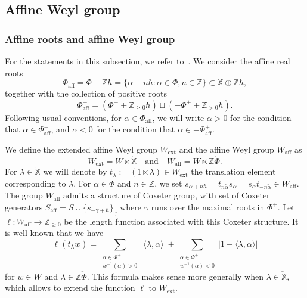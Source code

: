 \documentclass[11pt]{amsart}
\numberwithin{equation}{section}
\theoremstyle{plain}
\theoremstyle{definition}
\newcommand{\X}{{\mathbb X}}
\newcommand{\Xd}{\check{\X}}
\newcommand{\Z}{{\mathbb Z}}
\newcommand{\ex}{\mathrm{ext}}
\newcommand{\af}{\mathrm{aff}}
\begin{document}
\subsection{Affine Weyl group} 

\subsubsection{Affine roots and affine Weyl group} 

For the statements in this subsection, we refer to~\cite[\S\S 1--2]{macdonald}.
We consider the affine real roots 
\[
\Phi_\af=\Phi+\Z\hbar= \{\alpha+n\hbar : \alpha\in \Phi,n\in \Z\} \subset \X \oplus \Z \hbar,
\] 
together with the collection of positive roots
\[
\Phi^+_\af=(\Phi^++\Z_{\geq 0}\hbar) \sqcup (-\Phi^++\Z_{> 0}\hbar).
\] 
Following usual conventions, for $\alpha \in \Phi_\af$, we will write $\alpha >0$ for the condition that $\alpha \in \Phi^+_\af$, and $\alpha<0$ for the condition that $\alpha \in -\Phi^+_\af$.

We define the extended affine Weyl group $W_\ex$ and the affine Weyl group $W_\af$ as
\[
W_\ex=W\ltimes \Xd \quad \text{and} \quad W_\af= W\ltimes \Z\check{\Phi}. 
\]
For $\lambda\in \Xd$ we will denote by $t_\lambda := (1 \ltimes \lambda) \in W_\ex$ the translation element corresponding to $\lambda$. 
For $\alpha \in \Phi$ and $n \in \Z$,
we set $s_{\alpha+n\hbar} = t_{n\check{\alpha}} s_\alpha =s_\alpha t_{-n\check{\alpha}} \in W_\af$. 
The group $W_\af$ admits a structure of Coxeter group, with set of Coxeter generators $S_\af=S \cup \{s_{-\gamma+\hbar}\}_\gamma$ where $\gamma$ runs over the maximal roots in $\Phi^+$. 
Let $\ell: W_\af\rightarrow \Z_{\geq 0}$ be the length function associated with this Coxeter structure. 
It is well known that we have
\begin{equation}
\label{eq:length}
\ell(t_\lambda w) = \sum_{\substack{\alpha \in \Phi^+ \\ w^{-1}(\alpha) >0}} |\langle \lambda, \alpha \rangle | + \sum_{\substack{\alpha \in \Phi^+ \\ w^{-1}(\alpha) <0}} |1 + \langle \lambda,\alpha\rangle |
\end{equation}
for $w \in W$ and $\lambda \in \Z\check{\Phi}$. 
This formula makes sense more generally when $\lambda \in \Xd$, which allows to extend the function $\ell$ to $W_\ex$. 
\end{document}
